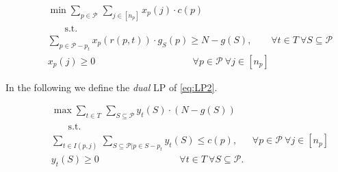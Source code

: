 \documentclass[11pt]{article}
\newcommand{\cC}{{\mathcal{C}}}
\newcommand{\cP}{{\mathcal{P}}}
\newcommand{\om}{{\Omega}}
\newcommand{\bbc}{{\bar{\cC}(I_t)}}
\begin{document}



\begin{equation}
	\label{eq:LP2}
	\begin{aligned}
~~~~~~~~	& \min \sum_{p \in \cP~} \sum_{j \in [n_p]}  x_p(j) \cdot c(p)\\
		& ~~~~~~~~\text{s.t. }\\
		& \sum_{p \in \cP-p_t} x_p(r(p,t)) \cdot g_S(p) \geq N-g(S), 	~~~~~~~~~\forall t \in T~\forall S  \subseteq \cP \\ 
		& x_p(j) \geq 0 ~~~~~~~~~~~~~~~~~~~~~~~~~~~~~~~~~~~~~~~~~~~~~~	\forall p \in \cP~\forall j \in [n_p]
	\end{aligned}
\end{equation} 

In the following we define the {\em dual} LP of \eqref{eq:LP2}. 

\begin{equation}
	\label{eq:dual}
	\begin{aligned}
 ~~~~~~~~	& \max \sum_{t \in T~} \sum_{S  \subseteq \cP} y_t(S) \cdot \left( N-g(S) \right)\\
		& ~~~~~~~~\text{s.t. }\\
		& \sum_{t \in I(p,j)~} \sum_{S \subseteq \cP \big|p \in S-p_t} y_t(S) \leq c(p), 	~~~~~~~\forall p \in \cP~\forall j \in [n_p]\\ 
			& y_t(S) \geq 0 ~~~~~~~~~~~~~~~~~~~~~~~~~~~~~~~~~~~~~~	\forall t \in T ~\forall S \subseteq \cP. 
	\end{aligned}
\end{equation} 
\end{document}
